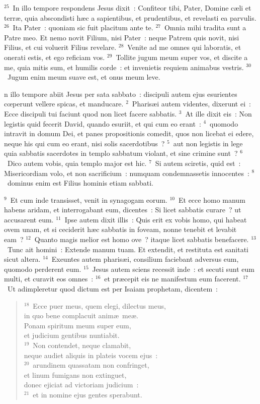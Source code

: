 ${}^{25}$~In illo tempore respondens Jesus dixit~: Confiteor tibi, Pater, Domine c\ae li et terr\ae , quia abscondisti h\ae c a sapientibus, et prudentibus, et revelasti ea parvulis.
${}^{26}$~Ita Pater~: quoniam sic fuit placitum ante te.
${}^{27}$~Omnia mihi tradita sunt a Patre meo. Et nemo novit Filium, nisi Pater~: neque Patrem quis novit, nisi Filius, et cui voluerit Filius revelare.
${}^{28}$~Venite ad me omnes qui laboratis, et onerati estis, et ego reficiam vos.
${}^{29}$~Tollite jugum meum super vos, et discite a me, quia mitis sum, et humilis corde~: et invenietis requiem animabus vestris.
${}^{30}$~Jugum enim meum suave est, et onus meum leve.

\bchapter
{}n illo tempore abiit Jesus per sata sabbato~: discipuli autem ejus esurientes cœperunt vellere spicas, et manducare.
${}^{2}$~Pharis\ae i autem videntes, dixerunt ei~: Ecce discipuli tui faciunt quod non licet facere sabbatis.
${}^{3}$~At ille dixit eis~: Non legistis quid fecerit David, quando esuriit, et qui cum eo erant~:
${}^{4}$~quomodo intravit in domum Dei, et panes propositionis comedit, quos non licebat ei edere, neque his qui cum eo erant, nisi solis sacerdotibus~?
${}^{5}$~aut non legistis in lege quia sabbatis sacerdotes in templo sabbatum violant, et sine crimine sunt~?
${}^{6}$~Dico autem vobis, quia templo major est hic.
${}^{7}$~Si autem sciretis, quid est~: Misericordiam volo, et non sacrificium~: numquam condemnassetis innocentes~:
${}^{8}$~dominus enim est Filius hominis etiam sabbati.


${}^{9}$~Et cum inde transisset, venit in synagogam eorum.
${}^{10}$~Et ecce homo manum habens aridam, et interrogabant eum, dicentes~: Si licet sabbatis curare~? ut accusarent eum.
${}^{11}$~Ipse autem dixit illis~: Quis erit ex vobis homo, qui habeat ovem unam, et si ceciderit h\ae c sabbatis in foveam, nonne tenebit et levabit eam~?
${}^{12}$~Quanto magis melior est homo ove~? itaque licet sabbatis benefacere.
${}^{13}$~Tunc ait homini~: Extende manum tuam. Et extendit, et restituta est sanitati sicut altera.
${}^{14}$~Exeuntes autem pharis\ae i, consilium faciebant adversus eum, quomodo perderent eum.
${}^{15}$~Jesus autem sciens recessit inde~: et secuti sunt eum multi, et curavit eos omnes~:
${}^{16}$~et pr\ae cepit eis ne manifestum eum facerent.
${}^{17}$~Ut adimpleretur quod dictum est per Isaiam prophetam, dicentem~:
\begin{verse}${}^{18}$~Ecce puer meus, quem elegi, dilectus meus,\\ in quo bene complacuit anim\ae\ me\ae .\\ Ponam spiritum meum super eum,\\ et judicium gentibus nuntiabit.\\
${}^{19}$~Non contendet, neque clamabit,\\ neque audiet aliquis in plateis vocem ejus~:\\
${}^{20}$~arundinem quassatam non confringet,\\ et linum fumigans non extinguet,\\ donec ejiciat ad victoriam judicium~:\\
${}^{21}$~et in nomine ejus gentes sperabunt.\end{verse}


